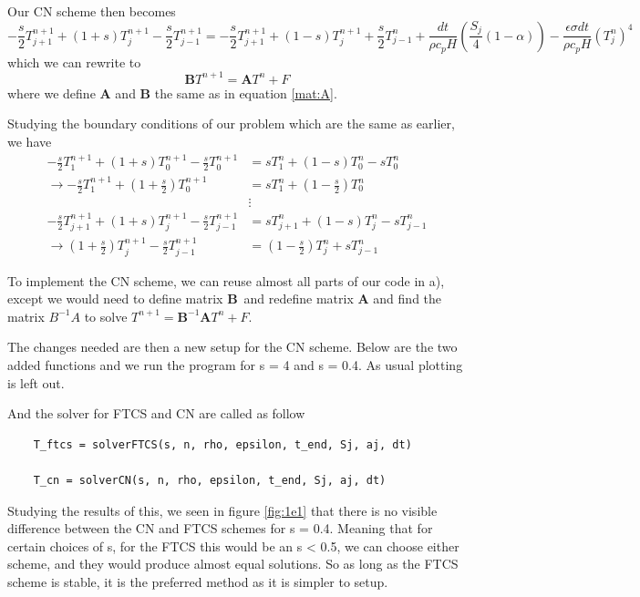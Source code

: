 \documentclass[10pt, a4paper]{amsart}
\begin{document}
Our CN scheme then becomes 
\begin{equation}
	- \frac{s}{2}T_{j+1}^{n+1} + (1 + s)T_j^{n+1} - \frac{s}{2}T_{j-1}^{n+1} = - \frac{s}{2}T_{j+1}^{n+1} + (1 - s)T_j^{n+1} + \frac{s}{2}T_{j-1}^{n} +\frac{dt}{\rho c_pH}\left(\frac{S_j}{4}\left(1-\alpha\right)\right) - \frac{\epsilon\sigma dt}{\rho c_pH} \left(T_j^n\right)^4
\end{equation}
which we can rewrite to 
\begin{equation}
	\mathbf{B}T^{n+1} = \mathbf{A}T^n + F
\end{equation}
where we define $\mathbf{A}$ and $\mathbf{B}$ the same as in equation \ref{mat:A}. 

Studying the boundary conditions of our problem which are the same as earlier, we have 
\begin{align}
	-\frac{s}{2}T_1^{n+1} + (1+s)T_0^{n+1} - \frac{s}{2}T_0^{n+1} &= sT_1^n + (1-s)T_0^n - sT_0^n \\
	\longrightarrow -\frac{s}{2}T_1^{n+1} + (1+\frac{s}{2})T_0^{n+1}&= sT_1^n + (1-\frac{s}{2})T_0^n\\
	&\vdots \\
	-\frac{s}{2}T_{j+1}^{n+1} + (1+s)T_j^{n+1} - \frac{s}{2}T_{j-1}^{n+1} &= sT_{j+1}^n + (1-s)T_{j}^n - sT_{j-1}^n \\
	\longrightarrow (1+\frac{s}{2})T_j^{n+1}-\frac{s}{2}T_{j-1}^{n+1} &=  (1-\frac{s}{2})T_{j}^n + sT_{j-1}^n
\end{align}

To implement the CN scheme, we can reuse almost all parts of our code in a), except we would need to define matrix $\mathbf{B}$ and redefine matrix $\mathbf{A}$ and find the matrix $B^{-1}A$ to solve $T^{n+1} = \mathbf{B}^{-1}\mathbf{A}T^n + F$. 

The changes needed are then a new setup for the CN scheme. Below are the two added functions and we run the program for s = 4 and s = 0.4. As usual plotting is left out. 


And the solver for FTCS and CN are called as follow
\begin{lstlisting}
	T_ftcs = solverFTCS(s, n, rho, epsilon, t_end, Sj, aj, dt)
	
	T_cn = solverCN(s, n, rho, epsilon, t_end, Sj, aj, dt)
\end{lstlisting}

Studying the results of this, we seen in figure \ref{fig:1e1} that there is no visible difference between the CN and FTCS schemes for s = 0.4. Meaning that for certain choices of s, for the FTCS this would be an s < 0.5, we can choose either scheme, and they would produce almost equal solutions. So as long as the FTCS scheme is stable, it is the preferred method as it is simpler to setup. 
\end{document}
